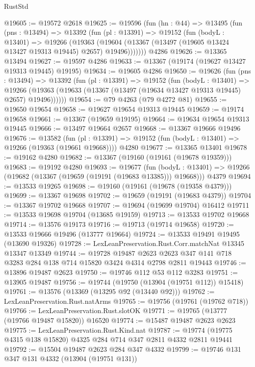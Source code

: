 \begin{lexlean}{RustStd}
\begin{coremodule}
@19605 := @19572 @2618
@19625 := @19596
    (fun (hn : @44) =>
    @13495
      (fun (pns : @13494) =>
      @13392
        (fun (pl : @13391) =>
        @19152
          (fun (bodyL : @13401) =>
          @19266
            (@19363
              (@19604 (@13367 (@13497 (@19605 @13424 @13427 @19313 @19445) @2657) @19496)))))))
    @4286
@19626 := @13365 @13494
@19627 := @19597 @4286
@19633 := @13367 (@19174 (@19627 @13427 @19313 @19445) @19195)
@19634 := @19605 @4286
@19650 := @19626
    (fun (pns : @13494) =>
    @13392
      (fun (pl : @13391) =>
      @19152
        (fun (bodyL : @13401) =>
        @19266 (@19363 (@19633 (@13367 (@13497 (@19634 @13427 @19313 @19445) @2657) @19496))))))
@19654 := @79 @4263 (@79 @4272 @81)
@19655 := @19650 @19654
@19658 := @19627 @19654 @19313 @19445
@19659 := @19174 @19658
@19661 := @13367 (@19659 @19195)
@19664 := @19634 @19654 @19313 @19445
@19666 := @13497 @19664 @2657
@19668 := @13367 @19666 @19496
@19676 := @13582
    (fun (pl : @13391) => @19152 (fun (bodyL : @13401) => @19266 (@19363 (@19661 @19668))))
    @4280
@19677 := @13365 @13401
@19678 := @19162 @4280
@19682 := @13367 (@19160 (@19161 (@19678 @19359)))
@19683 := @19192 @4280
@19693 := @19677
    (fun (bodyL : @13401) => @19266 (@19682 (@13367 (@19659 (@19191 (@19683 @13385))) @19668)))
    @4379
@19694 := @13533 @19265
@19698 := @19160 (@19161 (@19678 (@19358 @4379)))
@19699 := @13367 @19698
@19702 := @19659 (@19191 (@19683 @4379))
@19704 := @13367 @19702 @19668
@19707 := @19694 (@19699 @19704) @16412
@19711 := @13533 @19698 @19704 (@13685 @19159)
@19713 := @13533 @19702 @19668
@19714 := @13576 @19173
@19716 := @19713 (@19714 @19658)
@19720 := @13533 @19666 @19496 (@13777 @19664)
@19724 := @13533 @19491 @19495 (@13690 @19326)
@19728 := LexLeanPreservation.Rust.Corr.matchNat @13345 @13347 @13349
@19744 := @19728
    @19487
    @2623
    @2623
    @347
    @141
    @718
    @3283
    @284
    @138
    @714
    @15820
    @3424
    @4314
    @2798
    @2811
    @19443
@19746 := @13896 @19487 @2623
@19750 := @19746 @112 @53 @112 @3283
@19751 := @13905 @19487
@19756 := @19744 (@19750 (@13904 (@19751 @112)) @15418)
@19761 := @13576 (@13369 (@13295 @92 (@13440 @92)))
@19762 := LexLeanPreservation.Rust.natArms
@19765 := @19756 (@19761 (@19762 @718))
@19766 := LexLeanPreservation.Rust.slotOK
@19771 := @19765 (@13777 (@19766 @19487 @15820)) @16520
@19774 := @15487 @19487 @2623 @2623
@19775 := LexLeanPreservation.Rust.Kind.nat
@19787 := @19774 (@19775 @4315 @138 @15820) @4325 @284 @714 @347 @2811 @4332 @2811 @19441
@19792 := @15504 @19487 @2623 @284 @347 @4332
@19799 := @19746 @131 @347 @131 @4332 (@13904 (@19751 @131))

\end{coremodule}
\end{lexlean}
